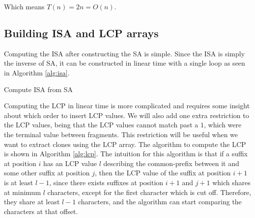Which means $T(n) = 2n = O(n)$.

\subsection*{Building ISA and LCP arrays}

Computing the ISA after constructing the SA is simple. Since the ISA is simply the inverse
of SA, it can be constructed in linear time with a single loop as seen in Algorithm
\ref{alg:isa}.

\begin{algorithm}[t]
  \SetAlgoLined\DontPrintSemicolon

  \vspace{0.5cm}
  \caption{Compute ISA from SA}
  \label{alg:isa}
\end{algorithm}


Computing the LCP in linear time is more complicated and requires some insight about which
order to insert LCP values. We will also add one extra restriction to the LCP values,
being that the LCP values cannot match past a $1$, which were the terminal value between
fragments. This restriction will be useful when we want to extract clones using the LCP
array. The algorithm to compute the LCP is shown in Algorithm \ref{alg:lcp}. The intuition
for this algorithm is that if a suffix at position $i$ has an LCP value $l$ describing the
common-prefix between it and some other suffix at position $j$, then the LCP value of the
suffix at position $i + 1$ is at least $l - 1$, since there exists suffixes at position $i
+ 1$ and $j + 1$ which shares at minimum $l$ characters, except for the first character
which is cut off. Therefore, they share at least $l - 1$ characters, and the algorithm can
start comparing the characters at that offset.

